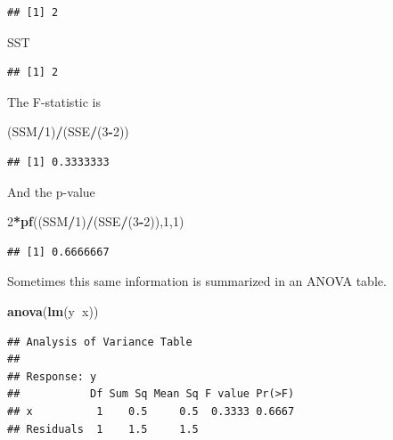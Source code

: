 \documentclass[]{book}
\newenvironment{Shaded}{\begin{snugshade}}{\end{snugshade}}
\newcommand{\KeywordTok}[1]{\textcolor[rgb]{0.13,0.29,0.53}{\textbf{#1}}}
\newcommand{\DecValTok}[1]{\textcolor[rgb]{0.00,0.00,0.81}{#1}}
\newcommand{\OperatorTok}[1]{\textcolor[rgb]{0.81,0.36,0.00}{\textbf{#1}}}
\newcommand{\NormalTok}[1]{#1}
\theoremstyle{definition}
\theoremstyle{definition}
\theoremstyle{definition}
\theoremstyle{remark}
\begin{document}
\begin{verbatim}
## [1] 2
\end{verbatim}

\begin{Shaded}
\begin{Highlighting}[]
\NormalTok{SST}
\end{Highlighting}
\end{Shaded}

\begin{verbatim}
## [1] 2
\end{verbatim}

The F-statistic is

\begin{Shaded}
\begin{Highlighting}[]
\NormalTok{(SSM}\OperatorTok{/}\DecValTok{1}\NormalTok{)}\OperatorTok{/}\NormalTok{(SSE}\OperatorTok{/}\NormalTok{(}\DecValTok{3}\OperatorTok{-}\DecValTok{2}\NormalTok{))}
\end{Highlighting}
\end{Shaded}

\begin{verbatim}
## [1] 0.3333333
\end{verbatim}

And the p-value

\begin{Shaded}
\begin{Highlighting}[]
\DecValTok{2}\OperatorTok{*}\KeywordTok{pf}\NormalTok{((SSM}\OperatorTok{/}\DecValTok{1}\NormalTok{)}\OperatorTok{/}\NormalTok{(SSE}\OperatorTok{/}\NormalTok{(}\DecValTok{3}\OperatorTok{-}\DecValTok{2}\NormalTok{)),}\DecValTok{1}\NormalTok{,}\DecValTok{1}\NormalTok{)}
\end{Highlighting}
\end{Shaded}

\begin{verbatim}
## [1] 0.6666667
\end{verbatim}

Sometimes this same information is summarized in an ANOVA table.

\begin{Shaded}
\begin{Highlighting}[]
\KeywordTok{anova}\NormalTok{(}\KeywordTok{lm}\NormalTok{(y}\OperatorTok{~}\NormalTok{x))}
\end{Highlighting}
\end{Shaded}

\begin{verbatim}
## Analysis of Variance Table
## 
## Response: y
##           Df Sum Sq Mean Sq F value Pr(>F)
## x          1    0.5     0.5  0.3333 0.6667
## Residuals  1    1.5     1.5
\end{verbatim}
\end{document}
